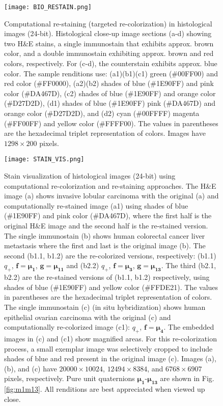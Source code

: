 \documentclass[superscriptaddress,longbibliography,aps,prl,twocolumn,10pt]{revtex4-2}
\begin{document}
\begin{figure}[t]
\centering
\texttt{[image: BIO\_RESTAIN.png]}
\vspace{-12pt}
\caption{\footnotesize{Computational re-staining (targeted re-colorization) in histological images (24-bit). Histological close-up image sections (a-d) showing two H\&E stains, a single immunostain that exhibits approx. brown color, and a double immunostain exhibiting approx. brown and red colors, respectively. For (c-d), the counterstain exhibits approx. blue color. The sample renditions use: (a1)(b1)(c1) green (\#00FF00) and red color (\#FF0000), (a2)(b2) shades of blue (\#1E90FF) and pink color (\#DA467D), (c2) shades of blue (\#1E90FF) and orange color (\#D27D2D), (d1) shades of blue (\#1E90FF) pink (\#DA467D) and orange color (\#D27D2D), and (d2) cyan (\#00FFFF) magenta (\#FF00FF) and yellow color (\#FFFF00). The values in parentheses are the hexadecimal triplet representation of colors. Images have $1298 \times 200$ pixels.}}
\label{fig:img_restain_bio}
\end{figure}

\begin{figure}[t]
\centering
\texttt{[image: STAIN\_VIS.png]}
\vspace{-12pt}
\caption{\footnotesize{Stain visualization of histological images (24-bit) using computational re-colorization and re-staining approaches. The H\&E image (a) shows invasive lobular carcinoma with the original (a) and computationally re-stained image (a1) using shades of blue (\#1E90FF) and pink color (\#DA467D), where the first half is the original H\&E image and the second half is the re-stained version. The single immunostain (b) shows human colorectal cancer liver metastasis where the first and last  is the original image (b). The second  (b1.1, b1.2) are the re-colorized versions, respectively: (b1.1) $q_+$, $\boldsymbol{f} = \boldsymbol{\mu_{1}}$, $\boldsymbol{g} = \boldsymbol{\mu_{11}}$ and (b2.2) $q_+$, $\boldsymbol{f} = \boldsymbol{\mu_{3}}$, $\boldsymbol{g} = \boldsymbol{\mu_{13}}$. The third  (b2.1, b2.2) are the re-stained versions of (b1.1, b1.2) respectively, using shades of blue (\#1E90FF) and yellow color (\#FFDE21). The values in parentheses are the hexadecimal triplet representation of colors. The single immunostain (c) (in situ hybridization) shows human epithelial ovarian carcinoma with the original (c) and computationally re-colorized image (c1): $q_+$, $\boldsymbol{f} = \boldsymbol{\mu_{4}}$. The embedded images in (c) and (c1) show magnified areas. For this re-colorization process, a small exemplar image was selectively cropped to include shades of blue and red present in the original image (c). Images (a), (b), and (c) have $20000 \times 10024$, $12494 \times 8384$, and $6768 \times 6907$ pixels, respectively. Pure unit quaternions $\boldsymbol{\mu_{1}}$-$\boldsymbol{\mu_{13}}$ are shown in Fig. \ref{fig:m1m13}. All renditions are best appreciated when viewed up close.}}
\label{fig:img_large_scale_vis_bio}
\end{figure}
\end{document}
